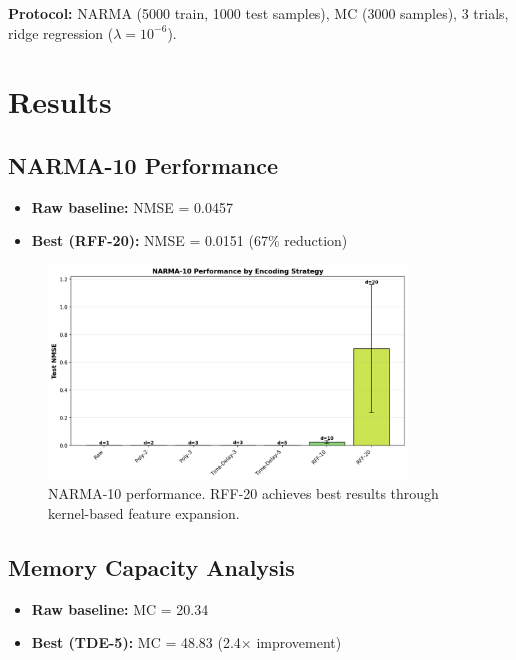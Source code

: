 \documentclass[11pt]{article}
\begin{document}
\textbf{Protocol:} NARMA (5000 train, 1000 test samples), MC (3000 samples), 3 trials, ridge regression ($\lambda=10^{-6}$).

\section{Results}

\subsection{NARMA-10 Performance}

\begin{itemize}
    \item \textbf{Raw baseline:} NMSE = 0.0457
    \item \textbf{Best (RFF-20):} NMSE = 0.0151 (67\% reduction)
\end{itemize}

\begin{figure}[h!]
    \centering
    \includegraphics[width=0.85\textwidth]{narma10_all_encoders.png}
    \caption{NARMA-10 performance. RFF-20 achieves best results through kernel-based feature expansion.}
    \label{fig:narma_comparison}
\end{figure}

\subsection{Memory Capacity Analysis}

\begin{itemize}
    \item \textbf{Raw baseline:} MC = 20.34
    \item \textbf{Best (TDE-5):} MC = 48.83 (2.4$\times$ improvement)
\end{itemize}
\end{document}
